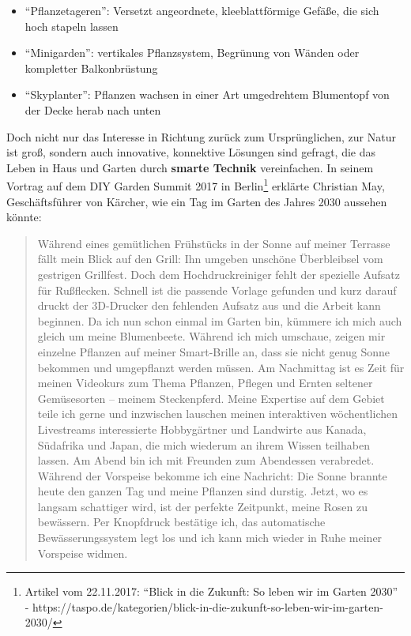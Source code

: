\begin{itemize}
\tightlist
\item
  ``Pflanzetageren'': Versetzt angeordnete, kleeblattförmige Gefäße, die
  sich hoch stapeln lassen\\
\item
  ``Minigarden'': vertikales Pflanzsystem, Begrünung von Wänden oder
  kompletter Balkonbrüstung\\
\item
  ``Skyplanter'': Pflanzen wachsen in einer Art umgedrehtem Blumentopf
  von der Decke herab nach unten
\end{itemize}

Doch nicht nur das Interesse in Richtung zurück zum Ursprünglichen, zur
Natur ist groß, sondern auch innovative, konnektive Lösungen sind
gefragt, die das Leben in Haus und Garten durch \textbf{smarte Technik}
vereinfachen. In seinem Vortrag auf dem DIY Garden Summit 2017 in
Berlin\footnote{Artikel vom 22.11.2017: ``Blick in die Zukunft: So leben
  wir im Garten 2030'' -
  https://taspo.de/kategorien/blick-in-die-zukunft-so-leben-wir-im-garten-2030/}
erklärte Christian May, Geschäftsführer von Kärcher, wie ein Tag im
Garten des Jahres 2030 aussehen könnte:

\begin{quote}
Während eines gemütlichen Frühstücks in der Sonne auf meiner Terrasse
fällt mein Blick auf den Grill: Ihn umgeben unschöne Überbleibsel vom
gestrigen Grillfest. Doch dem Hochdruckreiniger fehlt der spezielle
Aufsatz für Rußflecken. Schnell ist die passende Vorlage gefunden und
kurz darauf druckt der 3D-Drucker den fehlenden Aufsatz aus und die
Arbeit kann beginnen. Da ich nun schon einmal im Garten bin, kümmere ich
mich auch gleich um meine Blumenbeete. Während ich mich umschaue, zeigen
mir einzelne Pflanzen auf meiner Smart-Brille an, dass sie nicht genug
Sonne bekommen und umgepflanzt werden müssen. Am Nachmittag ist es Zeit
für meinen Videokurs zum Thema Pflanzen, Pflegen und Ernten seltener
Gemüsesorten -- meinem Steckenpferd. Meine Expertise auf dem Gebiet
teile ich gerne und inzwischen lauschen meinen interaktiven
wöchentlichen Livestreams interessierte Hobbygärtner und Landwirte aus
Kanada, Südafrika und Japan, die mich wiederum an ihrem Wissen teilhaben
lassen. Am Abend bin ich mit Freunden zum Abendessen verabredet. Während
der Vorspeise bekomme ich eine Nachricht: Die Sonne brannte heute den
ganzen Tag und meine Pflanzen sind durstig. Jetzt, wo es langsam
schattiger wird, ist der perfekte Zeitpunkt, meine Rosen zu bewässern.
Per Knopfdruck bestätige ich, das automatische Bewässerungssystem legt
los und ich kann mich wieder in Ruhe meiner Vorspeise widmen.
\end{quote}

